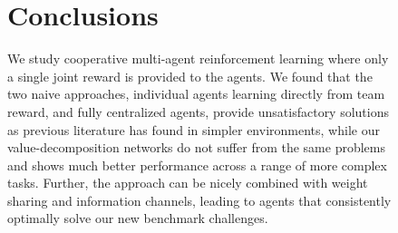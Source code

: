 \documentclass{article}
\begin{document}
\begin{figure}








\section{Conclusions}
We study cooperative multi-agent reinforcement learning where only a single joint reward is provided to the agents. We found that the two naive approaches, individual agents learning directly from team reward, and fully centralized agents, provide unsatisfactory solutions as previous literature has found in simpler environments, while our value-decomposition networks do not suffer from the same problems and shows much better performance across a range of more complex tasks. Further, the approach can be nicely combined with weight sharing and information channels, leading to agents that consistently optimally solve our new benchmark challenges. 


\end{figure}
\end{document}
